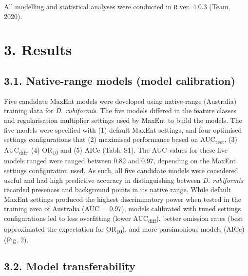 \documentclass[12pt,]{article}
\begin{document}
All modelling and statistical analyses were conducted in \texttt{R} ver.
4.0.3 (Team, 2020).

\hypertarget{results}{%
\section{3. Results}\label{results}}

\hypertarget{native-range-models-model-calibration}{%
\subsection{3.1. Native-range models (model
calibration)}\label{native-range-models-model-calibration}}

Five candidate MaxEnt models were developed using native-range
(Australia) training data for \emph{D. rubiformis}. The five models
differed in the feature classes and regularisation multiplier settings
used by MaxEnt to build the models. The five models were specified with
(1) default MaxEnt settings, and four optimised settings configurations
that (2) maximised performance based on AUC\textsubscript{test}, (3)
AUC\textsubscript{diff}, (4) OR\textsubscript{10} and (5) AICc (Table
S1). The AUC values for these five models ranged were ranged between
0.82 and 0.97, depending on the MaxEnt settings configuration used. As
such, all five candidate models were considered useful and had high
predictive accuracy in distinguishing between \emph{D. rubiformis}
recorded presences and background points in its native range. While
default MaxEnt settings produced the highest discriminatory power when
tested in the training area of Australia (AUC = 0.97), models calibrated
with tuned settings configurations led to less overfitting (lower
AUC\textsubscript{diff}), better omission rates (best approximated the
expectation for OR\textsubscript{10}), and more parsimonious models
(AICc) (Fig. 2).

\hypertarget{model-transferability}{%
\subsection{3.2. Model transferability}\label{model-transferability}}
\end{document}
